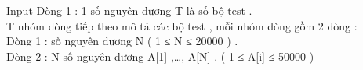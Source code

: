 Input
Dòng 1 : 1 số nguyên dương T là số bộ test .   
\\   T nhóm dòng tiếp theo mô tả các bộ test , mỗi nhóm dòng gồm 2 dòng :   
\\   Dòng 1 : số nguyên dương N  ( 1 ≤ N ≤ 20000 )  .   
\\   Dòng 2 : N số nguyên dương A[1] ,…, A[N] . ( 1 ≤ A[i] ≤ 50000 )   
\\